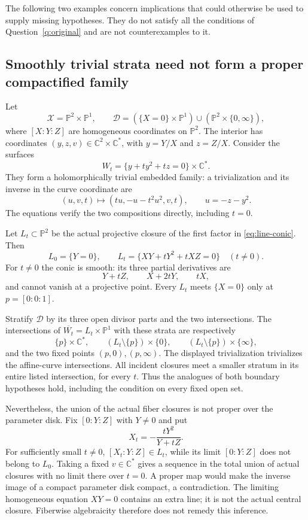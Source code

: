 \documentclass[11pt]{article}
\newcommand{\C}{\mathbb C}
\newcommand{\PP}{\mathbb P}
\newcommand{\cl}[1]{\overline{#1}}
\theoremstyle{definition}
\theoremstyle{remark}
\begin{document}
The following two examples concern implications that could otherwise be used to supply missing hypotheses. They do not satisfy all the conditions of Question~\ref{q:original} and are not counterexamples to it.

\subsection{Smoothly trivial strata need not form a proper compactified family}

Let
\[
 \mathcal X=\PP^2\times\PP^1,\qquad
 \mathcal D=(\{X=0\}\times\PP^1)\cup(\PP^2\times\{0,\infty\}),
\]
where $[X:Y:Z]$ are homogeneous coordinates on $\PP^2$. The interior has coordinates $(y,z,v)\in\C^2\times\C^*$, with $y=Y/X$ and $z=Z/X$. Consider the surfaces
\begin{equation}\label{eq:line-conic}
 W_t=\{y+t y^2+t z=0\}\times\C^*.
\end{equation}
They form a holomorphically trivial embedded family: a trivialization and its inverse in the curve coordinate are
\[
 (u,v,t)\longmapsto(tu,-u-t^2u^2,v,t),
 \qquad u=-z-y^2.
\]
The equations verify the two compositions directly, including $t=0$.

Let $L_t\subset\PP^2$ be the actual projective closure of the first factor in \eqref{eq:line-conic}. Then
\[
 L_0=\{Y=0\},\qquad
 L_t=\{XY+tY^2+tXZ=0\}\quad(t\ne0).
\]
For $t\ne0$ the conic is smooth: its three partial derivatives are
\[
 Y+tZ,\qquad X+2tY,\qquad tX,
\]
and cannot vanish at a projective point. Every $L_t$ meets $\{X=0\}$ only at $p=[0:0:1]$.

Stratify $\mathcal D$ by its three open divisor parts and the two intersections. The intersections of $\cl{W_t}=L_t\times\PP^1$ with these strata are respectively
\[
 \{p\}\times\C^*,\qquad
 (L_t\setminus\{p\})\times\{0\},\qquad
 (L_t\setminus\{p\})\times\{\infty\},
\]
and the two fixed points $(p,0),(p,\infty)$. The displayed trivialization trivializes the affine-curve intersections. All incident closures meet a smaller stratum in its entire listed intersection, for every $t$. Thus the analogues of both boundary hypotheses hold, including the condition on every fixed open set.

Nevertheless, the union of the actual fiber closures is not proper over the parameter disk. Fix $[0:Y:Z]$ with $Y\ne0$ and put
\[
 X_t=-\frac{tY^2}{Y+tZ}.
\]
For sufficiently small $t\ne0$, $[X_t:Y:Z]\in L_t$, while its limit $[0:Y:Z]$ does not belong to $L_0$. Taking a fixed $v\in\C^*$ gives a sequence in the total union of actual closures with no limit there over $t=0$. A proper map would make the inverse image of a compact parameter disk compact, a contradiction. The limiting homogeneous equation $XY=0$ contains an extra line; it is not the actual central closure. Fiberwise algebraicity therefore does not remedy this inference.
\end{document}
